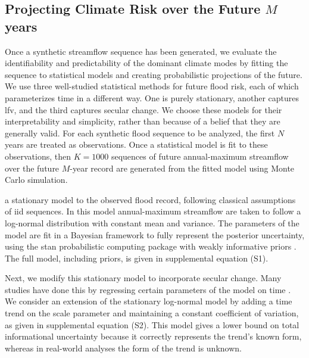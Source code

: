 \documentclass[
  draft,
  linenumbers
]{agujournal2019}
\begin{document}
\subsection{Projecting Climate Risk over the Future $M$ years}\label{sec:methods-estimating}

Once a synthetic streamflow sequence has been generated, we evaluate the identifiability and predictability of the dominant climate modes by fitting the sequence to statistical models and creating probabilistic projections of the future.
We use three well-studied statistical methods for future flood risk, each of which parameterizes time in a different way.
One is purely stationary, another captures \gls{lfv}, and the third captures secular change.
We choose these models for their interpretability and simplicity, rather than because of a belief that they are generally valid.
For each synthetic flood sequence to be analyzed, the first $N$ years are treated as observations.
Once a statistical model is fit to these observations, then $K=\num{1000}$ sequences of future annual-maximum streamflow over the future $M$-year record are generated from the fitted model using Monte Carlo simulation.

  a stationary model to the observed flood record, following classical assumptions of \gls{iid} sequences.
In this model annual-maximum streamflow are taken to follow a log-normal distribution with constant mean and variance.
The parameters of the model are fit  in a Bayesian framework to fully represent the posterior uncertainty, using the stan probabilistic computing package \citep{Carpenter:2017ke} with weakly informative priors \citep{gelman:2017,simpson:2017}.
The full model, including priors, is given in supplemental equation (S1).

Next, we modify this stationary model to incorporate secular change.
Many studies have done this by regressing certain parameters of the model on time \citep[see][for a comprehensive review]{Salas:2018ge}.
We consider an extension of the stationary log-normal model by adding a time trend on the scale parameter and maintaining a constant coefficient of variation, as given in supplemental equation (S2).
This model gives a lower bound on total informational uncertainty because it correctly represents the trend's known form, whereas in real-world analyses the form of the trend is unknown.
\end{document}

